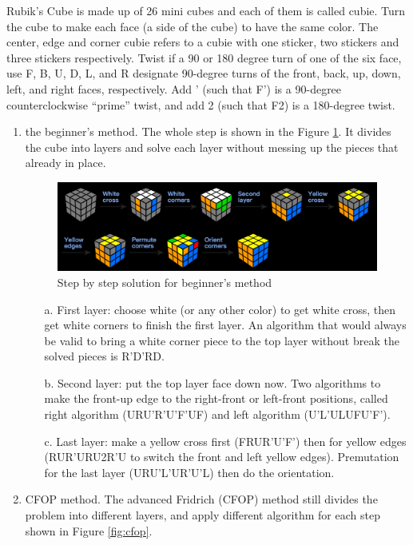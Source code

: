 \documentclass{assignment}
\begin{document}
    \begin{homeworkProblem}
    Rubik's Cube is made up of 26 mini cubes and each of them is called cubie. Turn the cube to make each face (a side of the cube) to have the same color. The center, edge and corner cubie refers to a cubie with one sticker, two stickers and three stickers respectively. Twist if a 90 or 180 degree turn of one of the six face,  use F, B, U, D, L, and R designate 90-degree turns of the front, back, up, down, left, and right faces, respectively. Add ' (such that F') is a 90-degree counterclockwise “prime” twist, and add 2 (such that F2) is a 180-degree twist. 
\begin{enumerate}
\item the beginner's method\cite{cube}. The whole step is shown in the Figure \ref{fig:beg}. It divides the cube into layers and solve each layer without messing up the pieces that already in place. 

\begin{figure}[!ht]
\centering
\includegraphics[scale=0.6]{cube1.png}
\caption{Step by step solution for beginner's method}
\label{fig:beg}
\end{figure}
\begin{enumerate}
\item[a.] First layer: choose white (or any other color) to get white cross, then get white corners to finish the first layer. An algorithm that would always be valid to bring a white corner piece to the top layer without break the solved pieces is R'D'RD.
\item[b.] Second layer: put the top layer face down now. Two algorithms to make the front-up edge to the right-front or left-front positions, called right algorithm (URU'R'U'F'UF) and left algorithm (U'L'ULUFU'F').  
\item[c.] Last layer: make a yellow cross first (FRUR'U'F') then for yellow edges (RUR'URU2R'U to switch the front and left yellow edges). Premutation for the last layer (URU'L'UR'U'L) then do the orientation.  
\end{enumerate}
\item CFOP method. The advanced Fridrich (CFOP) method still divides the problem into different layers, and apply different algorithm for each step shown in Figure \ref{fig:cfop}.


\end{enumerate}
\end{homeworkProblem}
\end{document}

